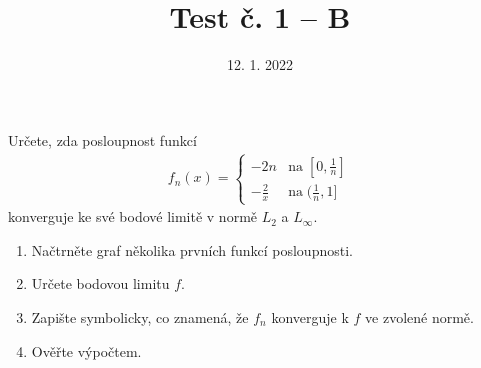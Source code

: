 \documentclass{article}
\begin{document}
\title{Test č. 1 -- B}
\date{12. 1. 2022}
\author{}
\maketitle


\noindent
Určete, zda posloupnost funkcí
\begin{align*}
        f_n(x) = \begin{cases} -2n & \mathrm{na}\; [0,\frac{1}{n}]\\
        -\frac{2}{x} & \mathrm{na}\; (\frac{1}{n},1] \end{cases}
    \end{align*}
konverguje ke své bodové limitě v normě $L_2$ a $L_\infty$.

\vspace{2cm}

\begin{enumerate}
\item Načtrněte graf několika prvních funkcí posloupnosti.
\item Určete bodovou limitu $f$.
\item Zapište symbolicky, co znamená, že $f_n$ konverguje k $f$ ve zvolené normě.
\item Ověřte výpočtem.
\end{enumerate}
\end{document}
